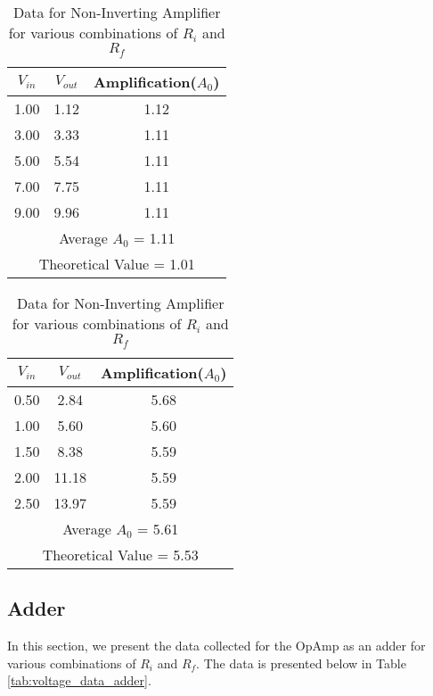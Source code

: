 \documentclass[12pt]{article}
\begin{document}
\begin{table}[H]
  \begin{subtable}{0.48\textwidth}
    \centering
    \begin{tabular}{|c|c|c|}
        \hline
        $V_{in}$ & $V_{out}$ & Amplification($A_0$) \\
        \hline
        1.00 & 1.12 & 1.12 \\
        3.00 & 3.33 & 1.11 \\
        5.00 & 5.54 & 1.11 \\
        7.00 & 7.75 & 1.11 \\
        9.00 & 9.96 & 1.11 \\
        \hline
        \multicolumn{3}{|c|}{Average $A_0$ = 1.11} \\
        \multicolumn{3}{|c|}{Theoretical Value = 1.01} \\
        \hline
    \end{tabular}
    \caption{$R_i=21800\Omega, R_f=2170\Omega$}
\end{subtable}
\hfill
\begin{subtable}{0.48\textwidth}
    \centering
    \begin{tabular}{|c|c|c|}
        \hline
        $V_{in}$ & $V_{out}$ & Amplification($A_0$) \\
        \hline
        0.50 & 2.84 & 5.68 \\
        1.00 & 5.60 & 5.60 \\
        1.50 & 8.38 & 5.59 \\
        2.00 & 11.18 & 5.59 \\
        2.50 & 13.97 & 5.59 \\
        \hline
        \multicolumn{3}{|c|}{Average $A_0$ = 5.61} \\
        \multicolumn{3}{|c|}{Theoretical Value = 5.53} \\
        \hline
    \end{tabular}
    \caption{$R_i=2170\Omega, R_f=9850\Omega$}
\end{subtable}
  
  \caption{Data for Non-Inverting Amplifier for various combinations of $R_i$ and $R_f$}
  \label{tab:combined2}
\end{table}

\subsection*{Adder}

In this section, we present the data collected for the OpAmp as an adder for various combinations of $R_i$ and $R_f$. The data is presented below in Table \ref{tab:voltage_data_adder}.
\end{document}
